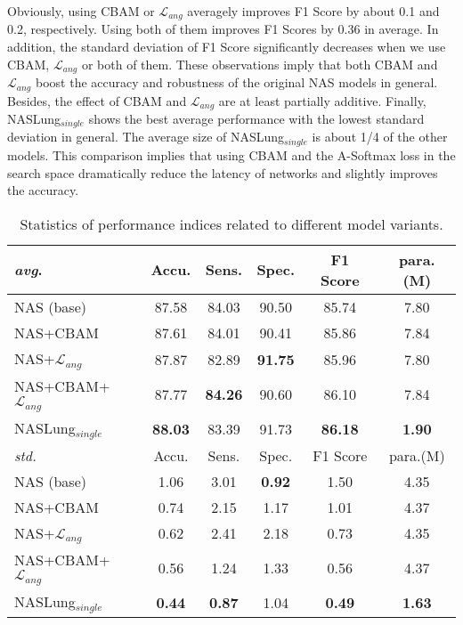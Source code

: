 \documentclass[final,5p,times,twocolumn]{elsarticle}
\begin{document}
Obviously, using CBAM or $\mathcal{L}_{ang}$ averagely improves F1 Score by about 0.1 and 0.2, respectively. Using both of them improves F1 Scores by 0.36 in average. In addition, the standard deviation  of F1 Score significantly decreases when we use CBAM, $\mathcal{L}_{ang}$ or both of them. These observations imply that both CBAM and $\mathcal{L}_{ang}$ boost the accuracy and robustness of the original NAS models in general. Besides, the effect of CBAM and $\mathcal{L}_{ang}$ are at least partially additive. 
 Finally, NASLung$_{single}$ shows the best average performance with the lowest standard deviation in general. The average size of NASLung$_{single}$ is about 1/4 of the other models. This comparison implies that using CBAM and the A-Softmax loss in the search space dramatically reduce the latency of networks and slightly improves the accuracy.




\begin{table*}
\centering
\caption{Statistics of performance indices related to different model variants.}
\small
\label{tab:ablation}
\begin{tabular}{l|ccccc}
\toprule
\textit{avg}. & Accu.	& Sens.	& Spec.	& F1 Score & para.(M) \\
\midrule
NAS (base)	&	87.58 	&	84.03 	&	90.50 	&	85.74 	&	7.80 	\\
NAS+CBAM	&	87.61 	&	84.01 	&	90.41 	&	85.86 	&	7.84 	\\
NAS+$\mathcal{L}_{ang}$	&	87.87 	&	82.89 	&	\textbf{91.75} 	&	85.96 	&	7.80 	\\
NAS+CBAM+$\mathcal{L}_{ang}$	&	87.77 	&	\textbf{84.26 }	&	90.60 	&	86.10 	&	7.84 	\\
NASLung$_{single}$	&	\textbf{88.03} 	&	83.39 	&	91.73 	&	\textbf{86.18} 	&	\textbf{1.90}	\\
\bottomrule \toprule
\textit{std.} & Accu.	& Sens.	& Spec.	& F1 Score & para.(M) \\
\midrule
NAS (base)	&	1.06 	&	3.01 	&	\textbf{0.92} 	&	1.50 	&	4.35 	\\
NAS+CBAM	&	0.74 	&	2.15 	&	1.17 	&	1.01 	&	4.37 	\\
NAS+$\mathcal{L}_{ang}$	&	0.62 	&	2.41 	&	2.18 	&	0.73 	&	4.35 	\\
NAS+CBAM+$\mathcal{L}_{ang}$	&	0.56 	&	1.24 	&	1.33 	&	0.56 	&	4.37 	\\
NASLung$_{single}$	&	\textbf{0.44} 	&	\textbf{0.87} 	&	1.04 	&	\textbf{0.49} 	&	\textbf{1.63} 	\\
\bottomrule												
\end{tabular}
\end{table*}
\end{document}
